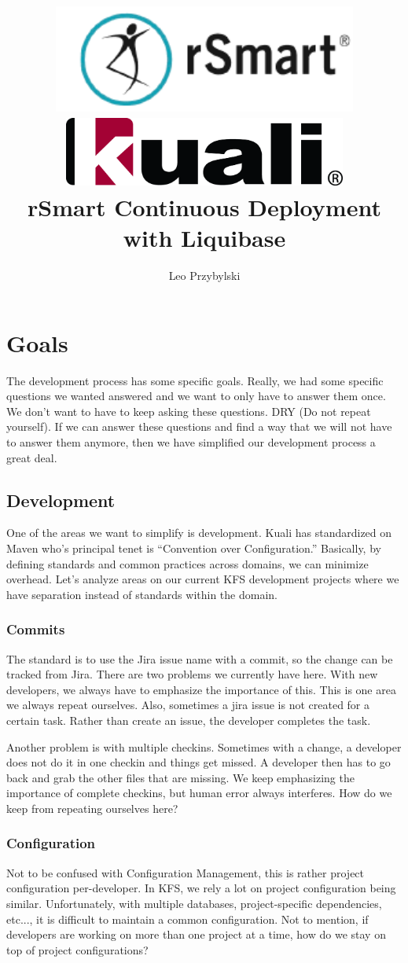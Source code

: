 \documentclass[12pt,notitlepage]{article}
\author{Leo Przybylski}
\title{\includegraphics[width=0.75\textwidth]{../images/rsmart_base.png}\\\includegraphics[width=0.70\textwidth]{../images/kuali_base.png}\\rSmart
Continuous Deployment with Liquibase}
\begin{document}
\maketitle
\tableofcontents

\abstract{}

\section{Goals}

The development process has some specific goals. Really, we had some
specific questions we wanted answered and we want to only have to
answer them once. We don't want to have to keep asking these
questions. DRY (Do not repeat yourself). If we can answer these questions and find a way that we
will not have to answer them anymore, then we have simplified our
development process a great deal.

\subsection{Development}

One of the areas we want to simplify is development. Kuali has
standardized on Maven who's principal tenet is ``Convention over
Configuration.'' Basically, by defining standards and common practices
across domains, we can minimize overhead. Let's analyze areas on our
current KFS development projects where we have separation instead of
standards within the domain.

\subsubsection{Commits}
The standard is to use the Jira issue name with a commit, so the
change can be tracked from Jira. There are two problems we currently
have here. With new developers, we always have to emphasize the
importance of this. This is one area we always repeat ourselves. Also,
sometimes a jira issue is not created for a certain task. Rather than
create an issue, the developer completes the task.

Another problem is with multiple checkins. Sometimes with a change, a
developer does not do it in one checkin and things get missed. A
developer then has to go back and grab the other files that are
missing. We keep emphasizing the importance of complete checkins, but
human error always interferes. How do we keep from repeating ourselves
here?

\subsubsection{Configuration}Not to be confused with Configuration
Management, this is rather project configuration
per-developer. In KFS, we rely a lot on project configuration being
similar. Unfortunately, with multiple databases, project-specific
dependencies, etc..., it is difficult to maintain a common
configuration. Not to mention, if developers are working on more than
one project at a time, how do we stay on top of project
configurations?
\end{document}
